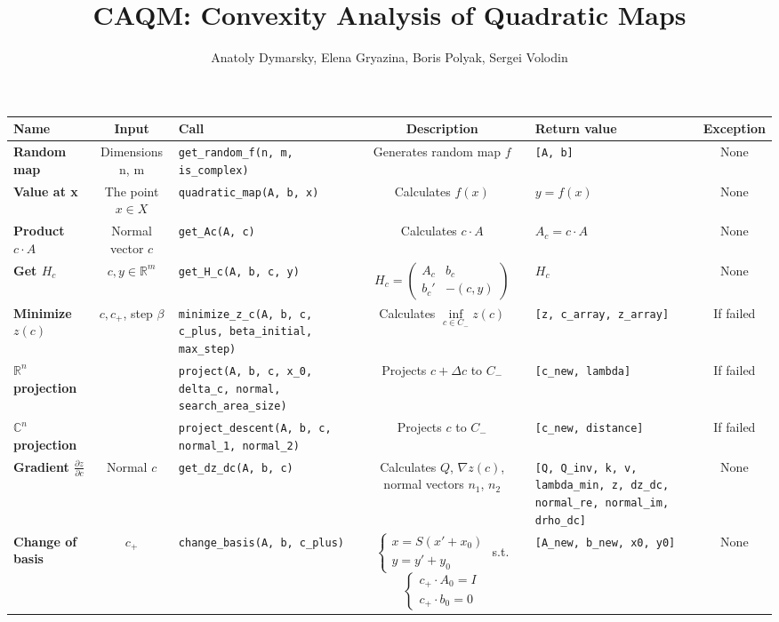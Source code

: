 \documentclass[a4paper]{article}
\title{CAQM: Convexity Analysis of Quadratic Maps}
\date{}
\author{Anatoly Dymarsky, Elena Gryazina, Boris Polyak, Sergei Volodin}
\newcommand{\R}{\mathbb{R}}
\begin{document}
\maketitle
\begin{tabular}{|p{28mm}|c|p{50mm}|c|p{30mm}|c|}
	\hline
	\bf Name & \bf Input & \bf Call & \bf Description & \bf Return value & \bf Exception\\\hline
	\bf Random map & {Dimensions n, m} & {\tt get\_random\_f(n, m, is\_complex)} & Generates random map $f$ & {\tt [A, b]} & None\\\hline
	\bf Value at x & The point $x\in X$ & {\tt quadratic\_map(A, b, x)} & Calculates $f(x)$ & $y=f(x)$ & None\\\hline
	\bf Product $c\cdot A$ & Normal vector $c$ & {\tt get\_Ac(A, c)} & Calculates $c\cdot A$ & $A_c=c\cdot A$ & None\\\hline
	\bf Get $H_c$ & $c,y\in\R^m$ & {\tt get\_H\_c(A, b, c, y)} & $H_c=\left(\begin{array}{cc}A_c & b_c\\b_c' &-(c,y) \end{array}\right)$ & $H_c$ & None\\\hline
	\bf Minimize $z(c)$ & $c,c_+$, step $\beta$ & {\tt minimize\_z\_c(A, b, c, c\_plus, beta\_initial, max\_step)} & Calculates $\inf\limits_{c\in C_-}z(c)$ & {\tt [z, c\_array, z\_array]} & If failed\\\hline
	\bf  $\R^n$ projection & & {\tt project(A, b, c, x\_0, delta\_c, normal, search\_area\_size)} & Projects $c+\Delta c$ to $C_-$ & {\tt [c\_new, lambda]} & If failed\\\hline
	\bf $\mathbb{C}^n$ projection & & {\tt project\_descent(A, b, c, normal\_1, normal\_2)} & Projects $c$ to $C_-$ & {\tt [c\_new, distance]} & If failed\\\hline
	\bf Gradient $\frac{\partial z}{\partial c}$ & Normal $c$ & {\tt get\_dz\_dc(A, b, c)} & Calculates $Q$, $\nabla z(c)$, normal vectors $n_1$, $n_2$ & {\tt [Q, Q\_inv, k, v, lambda\_min, z, dz\_dc, normal\_re, normal\_im, drho\_dc]} & None\\\hline
	\bf Change of basis & $c_+$ & {\tt change\_basis(A, b, c\_plus)} & $\begin{cases}
	x = S(x'+x_0)\\
	y = y' + y_0
	\end{cases}
	$ s.t.
	$\begin{cases}
	c_+\cdot A_0=I\\
	c_+\cdot b_0=0
	\end{cases}$ & {\tt [A\_new, b\_new, x0, y0]} & None\\\hline
\end{tabular}
\end{document}
